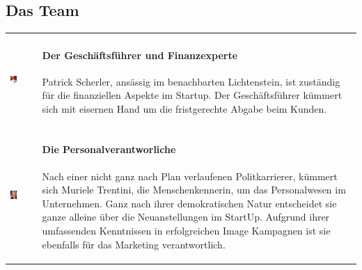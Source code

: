 \subsection{Das Team}
\begin{tabu} to \linewidth {X X}
	\begin{center}
		\includegraphics[width=0.3\textwidth]{images/team/derboss}
	\end{center}
	&
	\paragraph{Der Geschäftsführer und Finanzexperte} 
	Patrick Scherler, ansässig im benachbarten Lichtenstein, ist zuständig für die finanziellen Aspekte im Startup. Der Geschäftsführer kümmert sich mit eisernen Hand um die fristgerechte Abgabe beim Kunden. \\
	
	\begin{center}
		\includegraphics[width=0.3\textwidth]{images/team/diemenschenkennerin}
	\end{center}
	&
	\paragraph{Die Personalverantworliche}
	Nach einer nicht ganz nach Plan verlaufenen Politkarrierer, kümmert sich Muriele Trentini, die Menschenkennerin, um das Personalwesen im Unternehmen. Ganz nach ihrer demokratischen Natur entscheidet sie ganze alleine über die Neuanstellungen im StartUp. Aufgrund ihrer umfassenden Kenntnissen in erfolgreichen Image Kampagnen ist sie ebenfalls für das Marketing verantwortlich. \\
	

\end{tabu}
